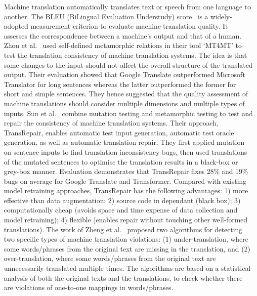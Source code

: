\label{sec:machinetranslation}
Machine translation automatically translates text or speech from one language to another.
The BLEU (BiLingual Evaluation Understudy) score~ is a widely-adopted measurement criterion to evaluate machine translation quality.
It assesses the correspondence between a machine's output and that of a human.
Zhou et al.~ used self-defined metamorphic relations in their tool `MT4MT' to test the translation consistency of machine translation systems.
The idea is that some changes to the input should not affect the overall structure of the translated output.
Their evaluation showed that Google Translate outperformed Microsoft Translator for long sentences whereas the latter outperformed the former for short and simple sentences. 
They hence suggested that the quality assessment of machine translations should consider multiple dimensions and multiple types of inputs.
Sun et al.~ combine mutation testing and metamorphic testing to test and repair the consistency of machine translation systems.
Their approach, TransRepair, enables automatic test input generation, automatic test oracle generation, as well as automatic translation repair. 
They first applied mutation on sentence inputs to find translation inconsistency bugs, then used translations of the mutated sentences to optimise the translation results in a black-box or grey-box manner. 
Evaluation demonstrates that TransRepair fixes 28\% and 19\% bugs on average for Google Translate and Transformer.
Compared with existing model retraining approaches, TransRepair has the following advantages: 
1) more effective than data augmentation; 2) source code in dependant (black box); 
3) computationally cheap (avoids space and time expense of data collection and model retraining); 
4) flexible (enables repair without touching other well-formed translations). 
The work of Zheng et al.~ proposed two algorithms for
detecting two specific types of machine translation violations:
(1) under-translation, where some words/phrases
from the original text are missing in the translation, and (2)
over-translation, where some words/phrases from the original
text are unnecessarily translated multiple times.
The algorithms are based on a statistical analysis of both the original texts and the translations, to check whether there are violations of one-to-one mappings in words/phrases.


